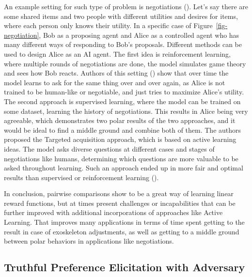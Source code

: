 \documentclass[
  letterpaper,
  numbers=noenddot,
  DIV=11]{scrreprt}
\theoremstyle{definition}
\theoremstyle{plain}
\theoremstyle{plain}
\theoremstyle{remark}
\begin{document}
An example setting for such type of problem is negotiations
(). Let's say there are
some shared items and two people with different utilities and desires
for items, where each person only knows their utility. In a specific
case of Figure~\ref{fig-negotiation}, Bob as a proposing agent and Alice
as a controlled agent who has many different ways of responding to Bob's
proposals. Different methods can be used to design Alice as an AI agent.
The first idea is reinforcement learning, where multiple rounds of
negotiations are done, the model simulates game theory and sees how Bob
reacts. Authors of this setting () show that over time the model learns to ask for the same
thing over and over again, as Alice is not trained to be human-like or
negotiable, and just tries to maximize Alice's utility. The second
approach is supervised learning, where the model can be trained on some
dataset, learning the history of negotiations. This results in Alice
being very agreeable, which demonstrates two polar results of the two
approaches, and it would be ideal to find a middle ground and combine
both of them. The authors proposed the Targeted acquisition approach,
which is based on active learning ideas. The model asks diverse
questions at different cases and stages of negotiations like humans,
determining which questions are more valuable to be asked throughout
learning. Such an approach ended up in more fair and optimal results
than supervised or reinforcement learning
().

In conclusion, pairwise comparisons show to be a great way of learning
linear reward functions, but at times present challenges or
incapabilities that can be further improved with additional
incorporations of approaches like Active Learning. That improves many
applications in terms of time spent getting to the result in case of
exoskeleton adjustments, as well as getting to a middle ground between
polar behaviors in applications like negotiations.

\subsection{Truthful Preference Elicitation with
Adversary}\label{truthful-preference-elicitation-with-adversary}
\end{document}
